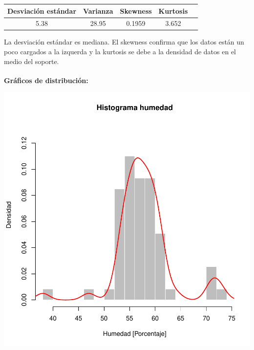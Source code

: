 \documentclass[11pt]{article}
\begin{document}
\begin{center}
\begin{tabular}{|c|c|c|c|c|}
    \hline
    Desviación estándar  & Varianza & Skewness & Kurtosis\\ \hline
    5.38 & 28.95 & 0.1959 & 3.652\\
    \hline
\end{tabular}
\end{center}

La desviación estándar es mediana. El skewness confirma que los datos están un poco cargados a la izquerda y la kurtosis se debe a la densidad de datos en el medio del soporte.
\\
\\
\textbf{Gráficos de distribución:}
\\

\begin{center}
    \includegraphics[scale = 0.3]{histhu}

\end{center}
\end{document}
